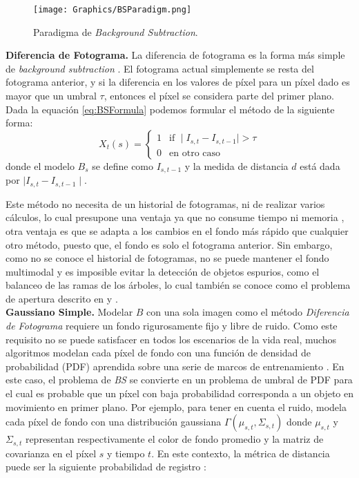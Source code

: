 \begin{figure}[h!]
	\centering
	\texttt{[image: Graphics/BSParadigm.png]}
	\caption{Paradigma de \textit{Background Subtraction}.}
	\label{fig:BSParadigm}
\end{figure}

\textbf{Diferencia de Fotograma.}
La diferencia de fotograma es la forma más simple de \textit{background subtraction} \cite{DeepjoySarat}. El fotograma actual simplemente se resta del fotograma anterior, y si la diferencia en los valores de píxel para un píxel dado es mayor que un umbral $\tau$, entonces el píxel se considera parte del primer plano. Dada la equación \ref{eq:BSFormula} podemos formular el método de la siguiente forma:
$$
X_t(s) = \left\{
\begin{array}{ll}
	1 & \mbox{if } \mid I_{s,t} - I_{s,t-1} \mid > \tau \\
	0 & \mbox{en otro caso}
\end{array}
\right.
$$
donde el modelo $B_s$ se define como $I_{s,t-1}$ y la medida de distancia $d$ está dada por $\mid I_{s,t} - I_{s,t-1} \mid$.

Este método no necesita de un historial de fotogramas, ni de realizar varios cálculos, lo cual presupone una ventaja ya que no consume tiempo ni memoria \cite{InsafSlimane}, otra ventaja es que se adapta a los cambios en el fondo más rápido que cualquier otro método, puesto que, el fondo es solo el fotograma anterior. Sin embargo, como no se conoce el historial de fotogramas, no se puede mantener el fondo multimodal y es imposible evitar la detección de objetos espurios, como el balanceo de las ramas de los árboles, lo cual también se conoce como el problema de apertura descrito en \cite{ApewokinApewokinWillsWillsGentile} y \cite{KentaroJohnBarryBrian}.\\

\textbf{Gaussiano Simple.}
Modelar $B$ con una sola imagen como el método \textit{Diferencia de Fotograma} requiere un fondo rigurosamente fijo y libre de ruido. Como este requisito no se puede satisfacer en todos los escenarios de la vida real, muchos algoritmos modelan cada píxel de fondo con una función de densidad de probabilidad (PDF) aprendida sobre una serie de marcos de entrenamiento \cite{YannickPierreMarcBrunoHeleneChristophe}. En este caso, el problema de \textit{BS} se convierte en un problema de umbral de PDF para el cual es probable que un píxel con baja probabilidad corresponda a un objeto en movimiento en primer plano. Por ejemplo, para tener en cuenta el ruido, \cite{WrenAzarbayejaniDarrellPentland} modela cada píxel de fondo con una distribución gaussiana $\Gamma(\mu_{s,t}, \Sigma_{s,t})$ donde  $\mu_{s,t}$ y $\Sigma_{s,t}$ representan respectivamente el color de fondo promedio y la matriz de covarianza en el píxel $s$ y tiempo $t$. En este contexto, la métrica de distancia puede ser la siguiente probabilidad de registro \cite{YannickPierreMarcBrunoHeleneChristophe}:

